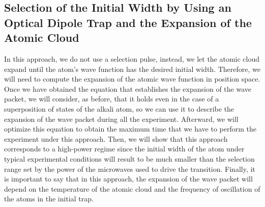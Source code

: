 \documentclass{article}
\begin{document}
\subsection{Selection of the Initial Width by Using an Optical Dipole Trap and the Expansion of the Atomic Cloud}
In this approach, we do not use a selection pulse, instead, we let the atomic cloud expand until the atom's wave function has the desired initial width. Therefore, we will need to compute the expansion of the atomic wave function in position space. Once we have obtained the equation that establishes the expansion of the wave packet, we will consider, as before, that it holds even in the case of a superposition of states of the alkali atom, so we can use it to describe the expansion of the wave packet during all the experiment. Afterward, we will optimize this equation to obtain the maximum time that we have to perform the experiment under this approach. Then, we will show that this approach corresponds to a high-power regime since the initial width of the atom under typical experimental conditions will result to be much smaller than the selection range set by the power of the microwaves used to drive the transition. Finally, it is important to say that in this approach, the expansion of the wave packet will depend on the temperature of the atomic cloud and the frequency of oscillation of the atoms in the initial trap.
\end{document}
